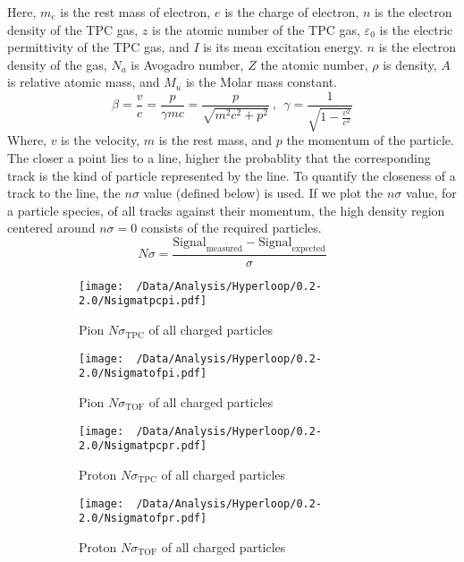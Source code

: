 \documentclass[12pt,a4paper,twoside]{report}
\begin{document}
Here, $m_e$ is the rest mass of electron, $e$ is the charge of electron,  $n$ is the electron density of the TPC gas, $z$ is the atomic number of the TPC gas, $\varepsilon_0$ is the electric permittivity of the TPC gas, and $I$ is its mean excitation energy. $n$ is the electron density of the gas, $N_a$ is Avogadro number, $Z$ the atomic number, $\rho$ is density, $A$ is relative atomic mass, and $M_u$ is the Molar mass constant.
\begin{equation}
	\beta=\frac{v}{c}=\frac{p}{\gamma mc}=\frac{p}{\sqrt{m^2c^2+p^2}}\ , \ \
	\gamma=\frac{1}{\sqrt{1-\frac{v^2}{c^2}}}
\end{equation}
Where, $v$ is the velocity, $m$ is the rest mass, and $p$ the momentum of the particle.
\\

The closer a point lies to a line, higher the probablity that the corresponding track is the kind of particle represented by the line. To quantify the closeness of a track to the line, the $n\sigma$ value (defined below) is used. If we plot the $n\sigma$ value, for a particle species, of all tracks against their momentum, the high density region centered around $n\sigma=0$ consists of the required particles.
\begin{equation}
	N\sigma=\frac{\mathrm{Signal}_\mathrm{measured}-\mathrm{Signal}_\mathrm{expected}}{\sigma}
\end{equation}
\begin{figure}[H]
	\begin{subfigure}{0.49\linewidth}
		\texttt{[image: ~/Data/Analysis/Hyperloop/0.2-2.0/Nsigmatpcpi.pdf]}
		\caption{Pion $N\sigma_\mathrm{TPC}$ of all charged particles}
	\end{subfigure}
	\begin{subfigure}{0.49\linewidth}
		\texttt{[image: ~/Data/Analysis/Hyperloop/0.2-2.0/Nsigmatofpi.pdf]}
		\caption{Pion $N\sigma_\mathrm{TOF}$ of all charged particles}
	\end{subfigure}
	\begin{subfigure}{0.49\linewidth}
		\texttt{[image: ~/Data/Analysis/Hyperloop/0.2-2.0/Nsigmatpcpr.pdf]}
		\caption{Proton $N\sigma_\mathrm{TPC}$ of all charged particles}
	\end{subfigure}
	\begin{subfigure}{0.49\linewidth}
		\texttt{[image: ~/Data/Analysis/Hyperloop/0.2-2.0/Nsigmatofpr.pdf]}
		\caption{Proton $N\sigma_\mathrm{TOF}$ of all charged particles}
	\end{subfigure}
	\caption{}
\end{figure}
\end{document}
